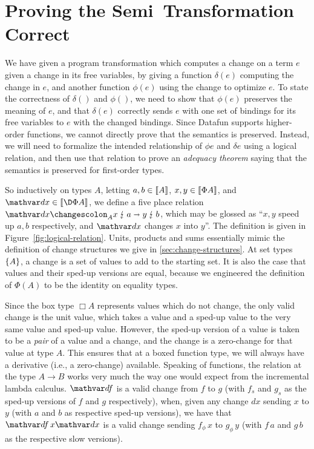 \section{Proving the Semi\naive\ Transformation Correct}

We have given a program transformation which computes a change on a
term $e$ given a change in its free variables, by giving a function
$\delta(e)$ computing the change in $e$, and another function 
$\phi(e)$ using the change to optimize $e$. To state the correctness
of $\delta()$ and $\phi()$, we need to show that $\phi(e)$ preserves
the meaning of $e$, and that
$\delta(e)$ correctly sends $e$ with one set of bindings for its free
variables to $e$ with the changed bindings.
%
Since Datafun supports higher-order functions, we cannot directly
prove that the semantics is preserved. Instead, we will need to
formalize the intended relationship of $\phi e$ and $\delta e$ using a
logical relation, and then use that relation to prove an
\emph{adequacy theorem} saying that the semantics is preserved for
first-order types.

So inductively on types $A$, letting $a,b \in \llbracket{A}\rrbracket$,
$x,y \in \llbracket{\Phi A}\rrbracket$, and $\dx \in \den{\DP A}$, we define a five
place relation $\weirdat{A}{\dx}{x}{a}{y}{b}$, which may be glossed as
``$x,y$ speed up $a,b$ respectively, and $\dx$ changes $x$ into $y$''.
The definition is given in Figure~\ref{fig:logical-relation}. Units,
products and sums essentially mimic the definition of change
structures we give in \cref{sec:change-structures}. At set types
$\{{A}\}$, a change is a set of values to add to the
starting set. It is also the case that values and their
sped-up versions are equal, because we engineered the definition of
$\Phi(A)$ to be the identity on equality types.

Since the box type $\Box A$ represents values which do not change, the
only valid change is the unit value, which takes a value and a sped-up
value to the very same value and sped-up value. However, the sped-up
version of a value is taken to be a \emph{pair} of a value and a
change, and the change is a zero-change for that value at type $A$.
This ensures that at a boxed function type, we will always have a
derivative (i.e., a zero-change) available. 
%
Speaking of functions, the relation at the type $A \to B$ works very
much the way one would expect from the incremental lambda calculus.
$\df$ is a valid change from $f$ to $g$ (with $f_s$ and $g_s$ as the
sped-up versions of $f$ and $g$ respectively), when, given any
change $dx$ sending $x$ to $y$ (with $a$ and $b$ as respective sped-up
versions), we have that $\df\,x\dx$ is a valid change sending
$f_\phi\,x$ to $g_\phi\,y$ (with $f\,a$ and $g\,b$ as the respective
slow versions). 

